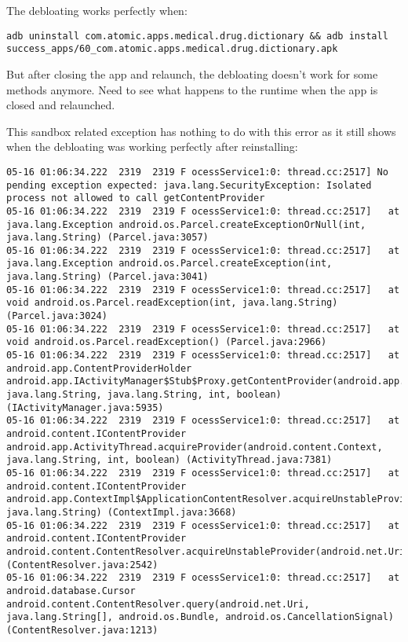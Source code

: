 The debloating works perfectly when:
\begin{lstlisting}
adb uninstall com.atomic.apps.medical.drug.dictionary && adb install success_apps/60_com.atomic.apps.medical.drug.dictionary.apk 
\end{lstlisting}
But after closing the app and relaunch, the debloating doesn't work for some methods anymore. Need to see what happens to the runtime when the app is closed and relaunched.

This sandbox related exception has nothing to do with this error as it still shows when the debloating was working perfectly after reinstalling:
\begin{lstlisting}
05-16 01:06:34.222  2319  2319 F ocessService1:0: thread.cc:2517] No pending exception expected: java.lang.SecurityException: Isolated process not allowed to call getContentProvider
05-16 01:06:34.222  2319  2319 F ocessService1:0: thread.cc:2517]   at java.lang.Exception android.os.Parcel.createExceptionOrNull(int, java.lang.String) (Parcel.java:3057)
05-16 01:06:34.222  2319  2319 F ocessService1:0: thread.cc:2517]   at java.lang.Exception android.os.Parcel.createException(int, java.lang.String) (Parcel.java:3041)
05-16 01:06:34.222  2319  2319 F ocessService1:0: thread.cc:2517]   at void android.os.Parcel.readException(int, java.lang.String) (Parcel.java:3024)
05-16 01:06:34.222  2319  2319 F ocessService1:0: thread.cc:2517]   at void android.os.Parcel.readException() (Parcel.java:2966)
05-16 01:06:34.222  2319  2319 F ocessService1:0: thread.cc:2517]   at android.app.ContentProviderHolder android.app.IActivityManager$Stub$Proxy.getContentProvider(android.app.IApplicationThread, java.lang.String, java.lang.String, int, boolean) (IActivityManager.java:5935)
05-16 01:06:34.222  2319  2319 F ocessService1:0: thread.cc:2517]   at android.content.IContentProvider android.app.ActivityThread.acquireProvider(android.content.Context, java.lang.String, int, boolean) (ActivityThread.java:7381)
05-16 01:06:34.222  2319  2319 F ocessService1:0: thread.cc:2517]   at android.content.IContentProvider android.app.ContextImpl$ApplicationContentResolver.acquireUnstableProvider(android.content.Context, java.lang.String) (ContextImpl.java:3668)
05-16 01:06:34.222  2319  2319 F ocessService1:0: thread.cc:2517]   at android.content.IContentProvider android.content.ContentResolver.acquireUnstableProvider(android.net.Uri) (ContentResolver.java:2542)
05-16 01:06:34.222  2319  2319 F ocessService1:0: thread.cc:2517]   at android.database.Cursor android.content.ContentResolver.query(android.net.Uri, java.lang.String[], android.os.Bundle, android.os.CancellationSignal) (ContentResolver.java:1213)

\end{lstlisting}
